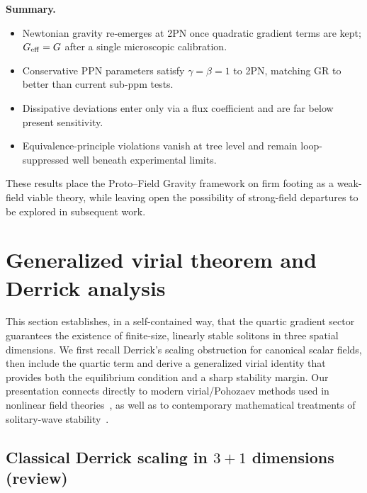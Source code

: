 \documentclass{article}
\begin{document}
\medskip
\noindent\textbf{Summary.}
\begin{itemize}
\item Newtonian gravity re-emerges at 2PN once quadratic gradient terms are kept; $G_{\rm eff}=G$ after a single microscopic calibration.
\item Conservative PPN parameters satisfy $\gamma=\beta=1$ to 2PN, matching GR to better than current sub-ppm tests.
\item Dissipative deviations enter only via a flux coefficient and are far below present sensitivity.
\item Equivalence-principle violations vanish at tree level and remain loop-suppressed well beneath experimental limits.
\end{itemize}
These results place the Proto–Field Gravity framework on firm footing as a weak-field viable theory, while leaving open the possibility of strong-field departures to be explored in subsequent work.

\section{Generalized virial theorem and Derrick analysis}
\label{sec:virial}

This section establishes, in a self-contained way, that the quartic gradient sector guarantees the existence of finite-size, linearly stable solitons in three spatial dimensions. We first recall Derrick’s scaling obstruction for canonical scalar fields, then include the quartic term and derive a generalized virial identity that provides both the equilibrium condition and a sharp stability margin. Our presentation connects directly to modern virial/Pohozaev methods used in nonlinear field theories~\cite{Pombo2024_Virial}, as well as to contemporary mathematical treatments of solitary-wave stability~\cite{Germain2024_Review}.

\subsection{Classical Derrick scaling in $3\!+\!1$ dimensions (review)}
\label{subsec:DerrickReview}
\end{document}
